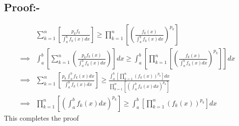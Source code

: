 \documentclass[12pt]{article}
\begin{document}
\color{black}
\pagebreak


\subsection{Proof:-}
\begin{align*}
& \sum_{k=1}^n \left[\frac{p_kf_k}{\displaystyle{\int_a^b f_k (x)dx}}\right]\geq \prod_{k=1}^n \left[\left(\frac{f_k (x)}{\displaystyle{\int_a^b f_k (x)dx}} \right)^{p_k}\right]\\
\implies & \int_a^b \left[\sum_{k=1}^n \left(\frac{p_kf_k(x)}{\displaystyle{\int_a^b f_k (x)dx}}\right) \right]dx \geq \int_a^b \left[  \prod_{k=1}^n \left[\left(\frac{f_k (x)}{\displaystyle{\int_a^b f_k (x)dx}} \right)^{p_k}\right]\right]dx\\
\implies & \sum_{k=1}^n \left[\frac{\displaystyle{p_k\int_a^bf_k(x)dx}}{\displaystyle{\int_a^b f_k (x)dx}}\right]\geq \frac{\displaystyle{\int_a^b \left[ 
\prod\limits_{k=1}^n \left( f_k (x)\right)^{p_k}\right]dx }}{\displaystyle{\prod\limits_{k=1}^n \left[\left(\int_a^b f_k (x)dx \right)^{p_k}\right]}}\\
\implies & \prod\limits_{k=1}^n \left[\left(\int_a^b f_k (x)dx \right)^{p_k}\right] \geq \int_a^b\left[ \prod_{k=1}^n\left(f_k (x)\right)^{p_k}\right]dx
\end{align*}
This completes the proof
\end{document}
